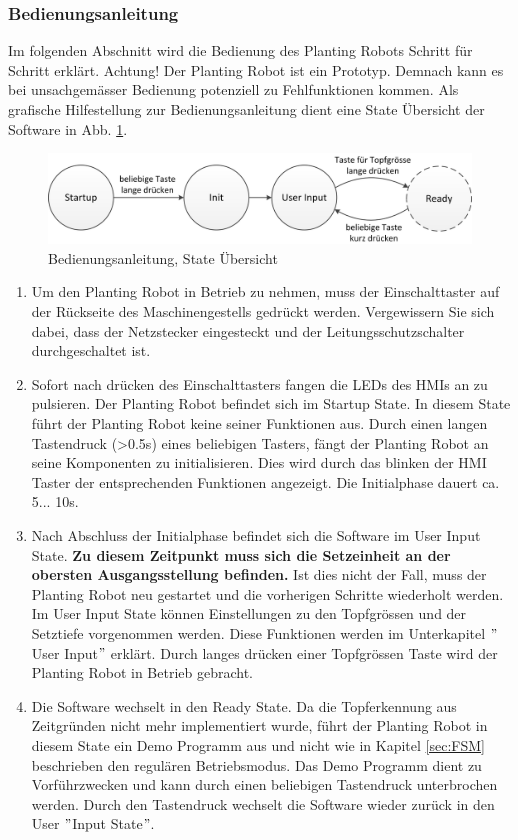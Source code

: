 \subsubsection{Bedienungsanleitung}
Im folgenden Abschnitt wird die Bedienung des Planting Robots Schritt für Schritt erklärt. Achtung! Der Planting Robot ist ein Prototyp. Demnach kann es bei unsachgemässer Bedienung potenziell zu Fehlfunktionen kommen. Als grafische Hilfestellung zur Bedienungsanleitung dient eine State Übersicht der Software in Abb. \ref{fig:Bedienungsanleitung}.

\begin{figure}[H]
	\includegraphics[draft=false,width=1\textwidth]{Illustrationen/6-Umsetzung/Bedienungsanleitung.png}
	\caption{Bedienungsanleitung, State Übersicht}
	\label{fig:Bedienungsanleitung}
\end{figure}

\begin{enumerate}
	\item Um den Planting Robot in Betrieb zu nehmen, muss der Einschalttaster auf der Rückseite des Maschinengestells gedrückt werden. Vergewissern Sie sich dabei, dass der Netzstecker eingesteckt und der Leitungsschutzschalter durchgeschaltet ist.
	\item Sofort nach drücken des Einschalttasters fangen die LEDs des HMIs an zu pulsieren. Der Planting Robot befindet sich im Startup State. In diesem State führt der Planting Robot keine seiner Funktionen aus. Durch einen langen Tastendruck (>0.5s) eines beliebigen Tasters, fängt der Planting Robot an seine Komponenten zu initialisieren. Dies wird durch das blinken der HMI Taster der entsprechenden Funktionen angezeigt. Die Initialphase dauert ca. 5... 10s.
	\item Nach Abschluss der Initialphase befindet sich die Software im User Input State. \textbf{Zu diesem Zeitpunkt muss sich die Setzeinheit an der obersten Ausgangsstellung befinden.} Ist dies nicht der Fall, muss der Planting Robot neu gestartet und die vorherigen Schritte wiederholt werden. Im User Input State können Einstellungen zu den Topfgrössen und der Setztiefe vorgenommen werden. Diese Funktionen werden im Unterkapitel $"$User Input$"$ erklärt. Durch langes drücken einer Topfgrössen Taste wird der Planting Robot in Betrieb gebracht.
	\item Die Software wechselt in den Ready State. Da die Topferkennung aus Zeitgründen nicht mehr implementiert wurde, führt der Planting Robot in diesem State ein Demo Programm aus und nicht wie in Kapitel \ref{sec:FSM} beschrieben den regulären Betriebsmodus. Das Demo Programm dient zu Vorführzwecken und kann durch einen beliebigen Tastendruck unterbrochen werden. Durch den Tastendruck wechselt die Software wieder zurück in den User $"$Input State$"$.
\end{enumerate}

